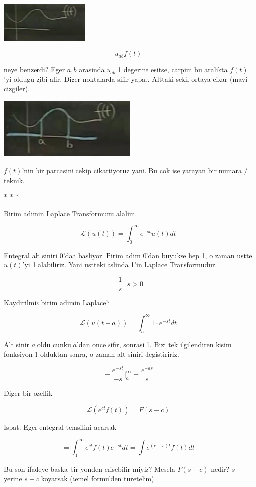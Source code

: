 \documentclass[12pt,fleqn]{article}\usepackage{../common}
\begin{document}
\includegraphics[height=2cm]{22_4.png}

\[ u_{ab}f(t) \]

neye benzerdi? Eger $a,b$ arasinda $u_{ab}$ 1 degerine esitse, carpim bu
aralikta $f(t)$'yi oldugu gibi alir. Diger noktalarda sifir yapar. Alttaki
sekil ortaya cikar (mavi cizgiler). 

\includegraphics[height=3cm]{22_5.png}

$f(t)$'nin bir parcasini cekip cikartiyoruz yani. Bu cok ise yarayan bir
numara / teknik. 

* * *

Birim adimin Laplace Transformunu alalim.

\[ \mathcal{L}(u(t)) = \int_{0}^{\infty} e^{-st}u(t) dt  \]

Entegral alt siniri 0'dan basliyor. Birim adim 0'dan buyukse hep 1, o zaman
ustte $u(t)$'yi 1 alabiliriz. Yani ustteki aslinda 1'in Laplace
Transformudur. 

\[ = \frac{1}{s} \ \ \ s>0 
\ \ \ \label{1}
\]

Kaydirilmis birim adimin Laplace'i

\[ \mathcal{L} (u(t-a)) = 
\int_{a}^{\infty} 1 \cdot e^{-st} dt
 \]

Alt sinir $a$ oldu cunku $a$'dan once sifir, sonrasi 1. Bizi tek
ilgilendiren kisim fonksiyon 1 olduktan sonra, o zaman alt siniri 
degistiririz. 

\[ = \frac{e^{-st}}{-s} \bigg|_{a}^{\infty} =
\frac{e^{-as}}{s}
\]

Diger bir ozellik

\[ \mathcal{L}(e^{ct}f(t)) = F(s-c) \]

Ispat: Eger entegral temsilini acarsak

\[ = \int _{0}^{\infty} e^{ct}f(t)e^{-st}dt  =
\int e^{(c-s)t} f(t) dt
 \]


Bu son ifadeye baska bir yonden erisebilir miyiz? Mesela $F(s-c)$ nedir? 
$s$ yerine $s-c$ koyarsak (temel formulden turetelim)
\end{document}
